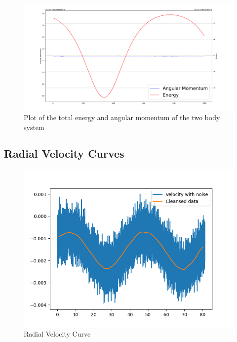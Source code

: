 \documentclass[reprint,english,notitlepage]{revtex4-2}
\begin{document}
	\begin{figure}[h!]
	  \centering
	  \includegraphics[scale = 0.15]{Figures/Energy_AngularMomentum_plot}
	  \caption{Plot of the total energy and angular momentum of the two body system}
	  \label{fig: tot_Energy_AM}
	\end{figure}
	
	
	\subsection{Radial Velocity Curves}	
		\begin{figure}[h!]
			\centering
			\includegraphics[scale = .5]{Figures/Other_Group_Radial_Velocity}
			\caption{Radial Velocity Curve}
			\label{fig: Radial Velocity}
		\end{figure}
\end{document}
